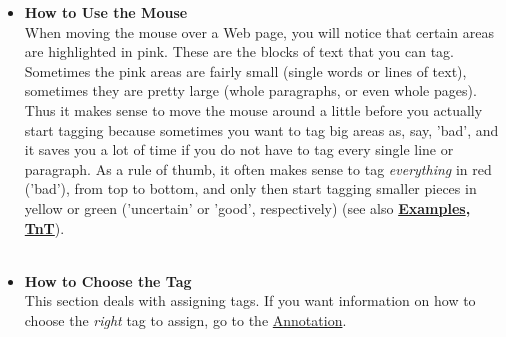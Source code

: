 \documentclass[12pt]{article}
\begin{document}
\begin{itemize}
	\item {\large \textbf{How to Use the Mouse}}\\
When moving the mouse over a Web page, you will notice that certain areas are highlighted in pink. These are the blocks of text that you can tag. Sometimes the pink areas are fairly small (single words or lines of text), sometimes they are pretty large (whole paragraphs, or even whole pages). Thus it makes sense to move the mouse around a little before you actually start tagging because sometimes you want to tag big areas as, say, 'bad', and it saves you a lot of time if you do not have to tag every single line or paragraph. As a rule of thumb, it often makes sense to tag \emph{everything} in red ('bad'), from top to bottom, and only then start tagging smaller pieces in yellow or green ('uncertain' or 'good', respectively) (see also \textbf{\hyperref{Examples}{Examples, described on page~}{}{Examples}, \hyperref{Tips \& Tricks}{Tips \& Tricks, page ~}{}{TnT}}).\\ \\


	\item {\large \textbf{How to Choose the Tag}}\\

This section deals with assigning tags. If you want information on how to choose the \emph{right} tag to assign, go to the \hyperref{Annotation Guidlines}{Annotation Guidlines on page ~}{}{Annotation}. \\


\end{itemize}
\end{document}

